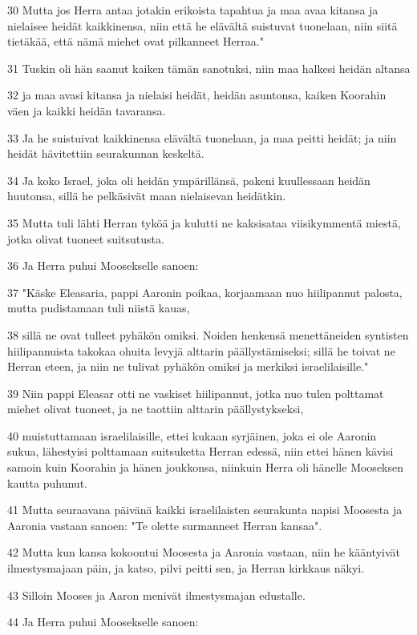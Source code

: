 \par 30 Mutta jos Herra antaa jotakin erikoista tapahtua ja maa avaa kitansa ja nielaisee heidät kaikkinensa, niin että he elävältä suistuvat tuonelaan, niin siitä tietäkää, että nämä miehet ovat pilkanneet Herraa."
\par 31 Tuskin oli hän saanut kaiken tämän sanotuksi, niin maa halkesi heidän altansa
\par 32 ja maa avasi kitansa ja nielaisi heidät, heidän asuntonsa, kaiken Koorahin väen ja kaikki heidän tavaransa.
\par 33 Ja he suistuivat kaikkinensa elävältä tuonelaan, ja maa peitti heidät; ja niin heidät hävitettiin seurakunnan keskeltä.
\par 34 Ja koko Israel, joka oli heidän ympärillänsä, pakeni kuullessaan heidän huutonsa, sillä he pelkäsivät maan nielaisevan heidätkin.
\par 35 Mutta tuli lähti Herran tyköä ja kulutti ne kaksisataa viisikymmentä miestä, jotka olivat tuoneet suitsutusta.
\par 36 Ja Herra puhui Moosekselle sanoen:
\par 37 "Käske Eleasaria, pappi Aaronin poikaa, korjaamaan nuo hiilipannut palosta, mutta pudistamaan tuli niistä kauas,
\par 38 sillä ne ovat tulleet pyhäkön omiksi. Noiden henkensä menettäneiden syntisten hiilipannuista takokaa ohuita levyjä alttarin päällystämiseksi; sillä he toivat ne Herran eteen, ja niin ne tulivat pyhäkön omiksi ja merkiksi israelilaisille."
\par 39 Niin pappi Eleasar otti ne vaskiset hiilipannut, jotka nuo tulen polttamat miehet olivat tuoneet, ja ne taottiin alttarin päällystykseksi,
\par 40 muistuttamaan israelilaisille, ettei kukaan syrjäinen, joka ei ole Aaronin sukua, lähestyisi polttamaan suitsuketta Herran edessä, niin ettei hänen kävisi samoin kuin Koorahin ja hänen joukkonsa, niinkuin Herra oli hänelle Mooseksen kautta puhunut.
\par 41 Mutta seuraavana päivänä kaikki israelilaisten seurakunta napisi Moosesta ja Aaronia vastaan sanoen: "Te olette surmanneet Herran kansaa".
\par 42 Mutta kun kansa kokoontui Moosesta ja Aaronia vastaan, niin he kääntyivät ilmestysmajaan päin, ja katso, pilvi peitti sen, ja Herran kirkkaus näkyi.
\par 43 Silloin Mooses ja Aaron menivät ilmestysmajan edustalle.
\par 44 Ja Herra puhui Moosekselle sanoen:
